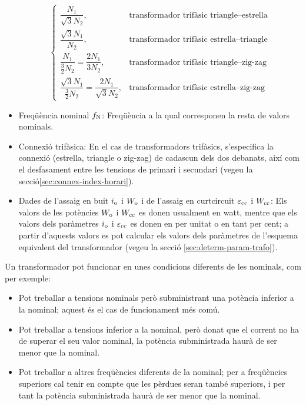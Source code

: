 \begin{itemize}
\begin{equation}
\begin{cases}
        \dfrac{N_1}{\sqrt{3}N_2}, & \text{transformador trifàsic triangle--estrella} \\[0.4cm]
        \dfrac{\sqrt{3}N_1}{N_2}, & \text{transformador trifàsic estrella--triangle} \\[0.4cm]
        \dfrac{N_1}{\frac{3}{2}N_2} = \dfrac{2 N_1}{3 N_2}, & \text{transformador trifàsic triangle--zig-zag} \\[0.4cm]
        \dfrac{\sqrt{3}N_1}{\frac{3}{2}N_2} = \dfrac{2 N_1}{\sqrt{3} N_2}, & \text{transformador trifàsic estrella--zig-zag}
         \end{cases}
       \end{equation}
   \item Freqüència nominal $f_\mathrm{N}$: Freqüència a la qual corresponen la resta de valors nominals.
   \item Connexió trifàsica: En el cas de transformadors trifàsics, s'especifica la connexió (estrella, triangle o zig-zag) de cadascun dels dos debanats, així com el desfasament entre les tensions de primari i secundari (vegeu la secció\vref{sec:connex-index-horari}).
   \item Dades de l'assaig en buit $i_\mathrm{o}$ i $W_\mathrm{o}$ i de l'assaig en curtcircuit $\varepsilon_\mathrm{cc}$ i $W_\mathrm{cc}$: Els valors de les potències $W_\mathrm{o}$ i $W_\mathrm{cc}$ es donen
usualment en watt, mentre que els valors dels paràmetres $i_\mathrm{o}$
i $\varepsilon_\mathrm{cc}$ es donen en per unitat o en tant per cent; a partir d'aquests valors es pot calcular els valors dels paràmetres de l'esquema equivalent del transformador  (vegeu la secció \vref{sec:determ-param-trafo}).
\end{itemize}

Un transformador pot funcionar en unes condicions diferents de les nominals, com per exemple:
\begin{itemize}
   \item Pot treballar a tensions nominals però subministrant una potència inferior a la nominal; aquest és el cas de funcionament més comú.
   \item Pot treballar a tensions inferior a la nominal, però donat que el corrent no ha de superar el seu valor nominal, la potència subministrada haurà de ser menor que la nominal.
   \item Pot treballar a altres freqüències diferents de la nominal; per a freqüències superiors cal tenir en compte que les pèrdues seran també superiors, i per tant la potència subministrada haurà de ser menor que la nominal.
\end{itemize}

